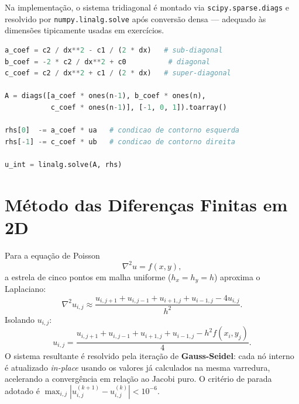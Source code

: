 \documentclass[12pt,a4paper]{article}
\begin{document}
Na implementação, o sistema tridiagonal é montado via \texttt{scipy.sparse.diags} e resolvido por \texttt{numpy.linalg.solve} após conversão densa — adequado às dimensões tipicamente usadas em exercícios.

\begin{lstlisting}[language=Python, caption={Montagem do sistema tridiagonal no MDF 1D.}]
a_coef = c2 / dx**2 - c1 / (2 * dx)   # sub-diagonal
b_coef = -2 * c2 / dx**2 + c0          # diagonal
c_coef = c2 / dx**2 + c1 / (2 * dx)   # super-diagonal

A = diags([a_coef * ones(n-1), b_coef * ones(n),
           c_coef * ones(n-1)], [-1, 0, 1]).toarray()

rhs[0]  -= a_coef * ua   # condicao de contorno esquerda
rhs[-1] -= c_coef * ub   # condicao de contorno direita

u_int = linalg.solve(A, rhs)
\end{lstlisting}

\section{Método das Diferenças Finitas em 2D}
Para a equação de Poisson
\begin{equation}
    \nabla^2 u = f(x, y),
\end{equation}
a estrela de cinco pontos em malha uniforme ($h_x = h_y = h$) aproxima o Laplaciano:
\begin{equation}
    \nabla^2 u_{i,j} \approx \frac{u_{i,j+1} + u_{i,j-1} + u_{i+1,j} + u_{i-1,j} - 4u_{i,j}}{h^2}.
\end{equation}
Isolando $u_{i,j}$:
\begin{equation}
    u_{i,j} = \frac{u_{i,j+1}+u_{i,j-1}+u_{i+1,j}+u_{i-1,j} - h^2 f(x_i,y_j)}{4}.
\end{equation}
O sistema resultante é resolvido pela iteração de \textbf{Gauss-Seidel}: cada nó interno é atualizado \emph{in-place} usando os valores já calculados na mesma varredura, acelerando a convergência em relação ao Jacobi puro. O critério de parada adotado é $\max_{i,j}|u_{i,j}^{(k+1)} - u_{i,j}^{(k)}| < 10^{-6}$.

\end{document}
